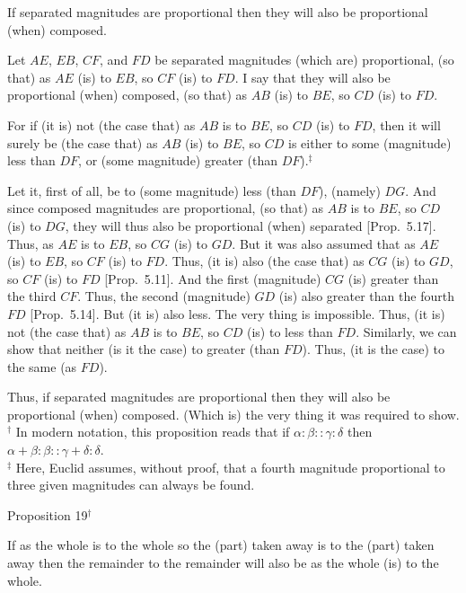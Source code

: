 If separated  magnitudes are proportional  then they will also be proportional (when)
composed.

\epsfysize=0.7in
\centerline{}

Let $AE$, $EB$, $CF$, and $FD$ be separated magnitudes (which are) proportional,
(so that) as $AE$ (is) to $EB$, so  $CF$ (is) to $FD$. I say that they will also be proportional (when)  composed, (so that) as $AB$ (is) to $BE$, so  $CD$ (is) to $FD$.

For if (it is) not (the case that) as $AB$ is to $BE$, so $CD$ (is) to $FD$, then it will
surely be (the case that) as $AB$ (is) to $BE$, so
 $CD$ is either to some (magnitude) less than $DF$, or (some magnitude) greater (than $DF$).$^\ddag$
 
 Let it, first of all, be to (some magnitude) less (than $DF$), (namely) $DG$. And since composed magnitudes are proportional, (so that) as $AB$ is
 to $BE$, so $CD$ (is) to $DG$,  they will  thus also be proportional (when) separated 
 [Prop.~5.17]. Thus, as $AE$ is to $EB$, so
 $CG$ (is) to $GD$. But it was also assumed that as $AE$ (is) to $EB$, so $CF$ (is)
 to $FD$. Thus, (it is) also (the case that) as $CG$ (is) to $GD$, so $CF$ (is) to $FD$ [Prop.~5.11]. And the first (magnitude) $CG$ (is)
 greater than the third $CF$. Thus, the second (magnitude) $GD$ (is)
 also greater than the fourth $FD$ [Prop.~5.14]. 
 But (it is) also less. The very thing is impossible. Thus, (it is) not (the case that) as $AB$ is to $BE$, so $CD$ (is) to less than $FD$. Similarly, we can show
 that neither (is it the case) to greater (than $FD$). Thus, (it is the case) to
 the same (as $FD$).
 
 Thus, if separated  magnitudes are proportional  then they will also be 
 proportional (when)
composed. (Which is) the very thing it was required to show.
{\footnotesize \noindent$^\dag$ In modern notation, this proposition
reads that if $\alpha:\beta::\gamma:\delta$ then $\alpha+\beta:\beta::
\gamma+\delta:\delta$.}\\
{\footnotesize \noindent$^\ddag$ Here, Euclid assumes, without proof, that
a fourth magnitude proportional to three given magnitudes can always
be found.}


\begin{center}
{\large Proposition 19}$^\dag$
\end{center}

If as the whole is to the whole so the (part) taken
away is to the (part) taken away then the remainder to the remainder will
also be as the whole (is) to the whole.


